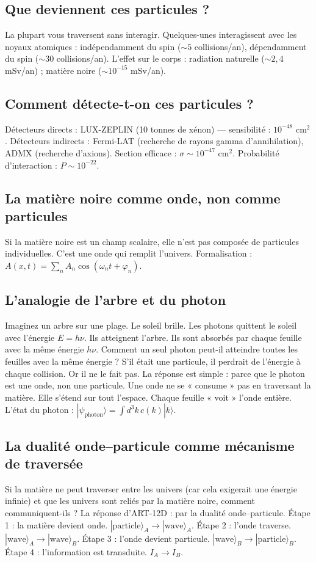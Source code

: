 \documentclass[11pt,a4paper]{article}
\begin{document}
\subsection{Que deviennent ces particules ?}
La plupart vous traversent sans interagir. Quelques-unes interagissent avec les noyaux atomiques : indépendamment du spin ($\sim 5$ collisions/an), dépendamment du spin ($\sim 30$ collisions/an). L'effet sur le corps : radiation naturelle ($\sim 2,4$ mSv/an) ; matière noire ($\sim 10^{-15}$ mSv/an).

\subsection{Comment détecte-t-on ces particules ?}
Détecteurs directs : LUX-ZEPLIN (10 tonnes de xénon) --- sensibilité : $10^{-48}$ cm$^2$. Détecteurs indirects : Fermi-LAT (recherche de rayons gamma d'annihilation), ADMX (recherche d'axions). Section efficace : $\sigma \sim 10^{-47}$ cm$^2$. Probabilité d'interaction : $P \sim 10^{-22}$.

\subsection{La matière noire comme onde, non comme particules}
Si la matière noire est un champ scalaire, elle n'est pas composée de particules individuelles. C'est une onde qui remplit l'univers. Formalisation : $A(x,t) = \sum_n A_n \cos(\omega_n t + \varphi_n)$.

\subsection{L'analogie de l'arbre et du photon}
Imaginez un arbre sur une plage. Le soleil brille. Les photons quittent le soleil avec l'énergie $E = h\nu$. Ils atteignent l'arbre. Ils sont absorbés par chaque feuille avec la même énergie $h\nu$. Comment un seul photon peut-il atteindre toutes les feuilles avec la même énergie ? S'il était une particule, il perdrait de l'énergie à chaque collision. Or il ne le fait pas. La réponse est simple : parce que le photon est une onde, non une particule. Une onde ne se « consume » pas en traversant la matière. Elle s'étend sur tout l'espace. Chaque feuille « voit » l'onde entière. L'état du photon : $|\psi_{\text{photon}}\rangle = \int d^3k \, c(k) |k\rangle$.

\subsection{La dualité onde--particule comme mécanisme de traversée}
Si la matière ne peut traverser entre les univers (car cela exigerait une énergie infinie) et que les univers sont reliés par la matière noire, comment communiquent-ils ? La réponse d'ART-12D : par la dualité onde--particule. Étape 1 : la matière devient onde. $|\text{particle}\rangle_A \to |\text{wave}\rangle_A$. Étape 2 : l'onde traverse. $|\text{wave}\rangle_A \to |\text{wave}\rangle_B$. Étape 3 : l'onde devient particule. $|\text{wave}\rangle_B \to |\text{particle}\rangle_B$. Étape 4 : l'information est transduite. $I_A \to I_B$.
\end{document}
